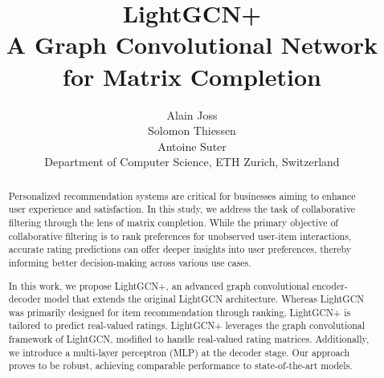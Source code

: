 \documentclass[10pt,conference,compsocconf]{IEEEtran}
\begin{document}
\title{LightGCN+ \\ A Graph Convolutional Network for Matrix Completion}

\author{
  Alain Joss \\
  Solomon Thiessen \\
  Antoine Suter \\
  Department of Computer Science, ETH Zurich, Switzerland
}

\maketitle

\begin{abstract}
  Personalized recommendation systems are critical for businesses aiming to enhance user experience and satisfaction. In this study, we address the task of collaborative filtering through the lens of matrix completion. While the primary objective of collaborative filtering is to rank preferences for unobserved user-item interactions, accurate rating predictions can offer deeper insights into user preferences, thereby informing better decision-making across various use cases.
  
  In this work, we propose LightGCN+, an advanced graph convolutional encoder-decoder model that extends the original LightGCN architecture. Whereas LightGCN was primarily designed for item recommendation through ranking, LightGCN+ is tailored to predict real-valued ratings.
  LightGCN+ leverages the graph convolutional framework of LightGCN, modified to handle real-valued rating matrices. Additionally, we introduce a multi-layer perceptron (MLP) at the decoder stage.
  Our approach proves to be robust, achieving comparable performance to state-of-the-art models.
\end{abstract}
\end{document}
